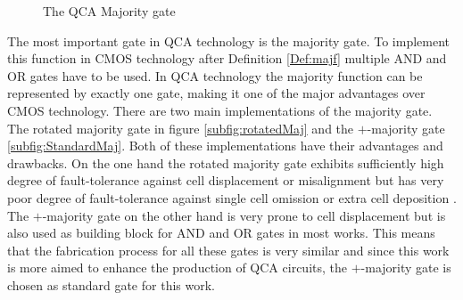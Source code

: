 \begin{figure}
{ 
		\label{subfig:StandardOr}
	}
	\caption{The QCA Majority gate} \label{fig:QCAMaj}
\end{figure}
The most important gate in QCA technology is the majority gate. To implement this function in CMOS technology after Definition \ref{Def:majf} multiple AND and OR gates have to be used. In QCA technology the majority function can be represented by exactly one gate, making it one of the major advantages over CMOS technology. There are two main implementations of the majority gate. The rotated majority gate in figure \ref{subfig:rotatedMaj} and the $+$-majority gate \ref{subfig:StandardMaj}. Both of these implementations have their advantages and drawbacks. On the one hand the rotated majority gate exhibits sufficiently high degree of fault-tolerance against cell displacement or misalignment but has very poor degree of fault-tolerance against single cell omission or extra cell deposition \cite{majorityrotated}. The $+$-majority gate on the other hand is very prone to cell displacement but is also used as building block for AND and OR gates in most works. This means that the fabrication process for all these gates is very similar and since this work is more aimed to enhance the production of QCA circuits, the $+$-majority gate is chosen as standard gate for this work.\\

